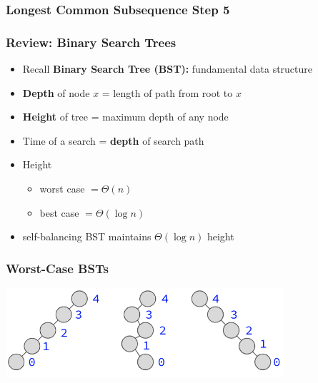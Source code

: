 \documentclass{beamer}
\begin{document}
\begin{frame} \frametitle{Longest Common Subsequence Step 5}
  {\small
  \begin{algorithmic}[1]
      \State \Return{$\langle \rangle$} 
    \EndIf
      \State {} 
      \State {}
    \Else
      \State {}
    \EndIf
    \EndFunction
  \end{algorithmic}
  }
\end{frame}

\begin{frame} \frametitle{Review: Binary Search Trees}
\begin{itemize}
  \item Recall \textbf{Binary Search Tree (BST):} fundamental data structure
  \item \textbf{Depth} of node $x$ = length of path from root to $x$
  \item \textbf{Height} of tree = maximum depth of any node
  \item Time of a search = \textbf{depth} of search path
  \item Height
    \begin{itemize}
      \item worst case $= \Theta(n)$
      \item best case $= \Theta(\log n)$
    \end{itemize}
  \item self-balancing BST maintains $\Theta(\log n)$ height
  \end{itemize}
\end{frame}

\begin{frame} \frametitle{Worst-Case BSTs}
  \begin{center}
    \includegraphics[height=1.3in]{bst_worst_case.png}
  \end{center}
\end{frame}
\end{document}
